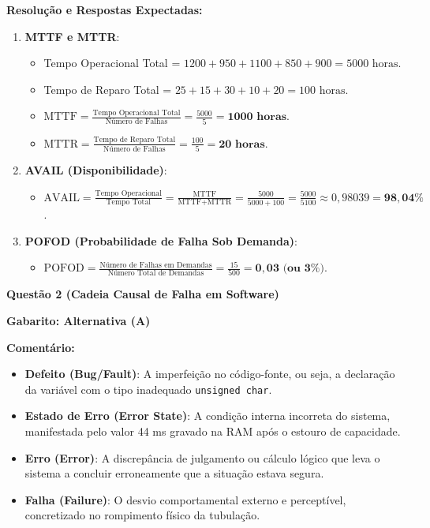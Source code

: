 \documentclass[12pt,a4paper]{article}
\begin{document}
\textbf{Resolução e Respostas Expectadas:}
\begin{enumerate}[label=\textbf{\alph*)}]
    \item \textbf{MTTF e MTTR}:
    \begin{itemize}
        \item Tempo Operacional Total = $1200 + 950 + 1100 + 850 + 900 = 5000\text{ horas}$.
        \item Tempo de Reparo Total = $25 + 15 + 30 + 10 + 20 = 100\text{ horas}$.
        \item $\text{MTTF} = \frac{\text{Tempo Operacional Total}}{\text{Número de Falhas}} = \frac{5000}{5} = \mathbf{1000\text{ horas}}$.
        \item $\text{MTTR} = \frac{\text{Tempo de Reparo Total}}{\text{Número de Falhas}} = \frac{100}{5} = \mathbf{20\text{ horas}}$.
    \end{itemize}

    \item \textbf{AVAIL (Disponibilidade)}:
    \begin{itemize}
        \item $\text{AVAIL} = \frac{\text{Tempo Operacional}}{\text{Tempo Total}} = \frac{\text{MTTF}}{\text{MTTF} + \text{MTTR}} = \frac{5000}{5000 + 100} = \frac{5000}{5100} \approx 0,98039 = \mathbf{98,04\%}$.
    \end{itemize}

    \item \textbf{POFOD (Probabilidade de Falha Sob Demanda)}:
    \begin{itemize}
        \item $\text{POFOD} = \frac{\text{Número de Falhas em Demandas}}{\text{Número Total de Demandas}} = \frac{15}{500} = \mathbf{0,03\text{ (ou } 3\%\text{)}}$.
    \end{itemize}
\end{enumerate}

\vspace{0.5cm}

\textbf{Questão 2 (Cadeia Causal de Falha em Software)}

\textbf{Gabarito: Alternativa (A)}

\textbf{Comentário:}
\begin{itemize}
    \item \textbf{Defeito (Bug/Fault)}: A imperfeição no código-fonte, ou seja, a declaração da variável com o tipo inadequado \texttt{unsigned char}.
    \item \textbf{Estado de Erro (Error State)}: A condição interna incorreta do sistema, manifestada pelo valor 44 ms gravado na RAM após o estouro de capacidade.
    \item \textbf{Erro (Error)}: A discrepância de julgamento ou cálculo lógico que leva o sistema a concluir erroneamente que a situação estava segura.
    \item \textbf{Falha (Failure)}: O desvio comportamental externo e perceptível, concretizado no rompimento físico da tubulação.
\end{itemize}
\end{document}
